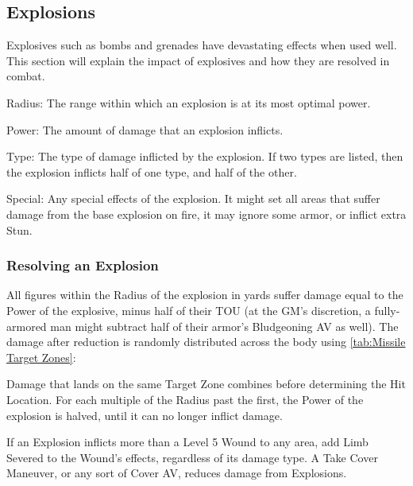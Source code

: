\documentclass[oneside,11pt,english]{book}
\begin{document}
\subsection{Explosions}\label{sec:Explosions}
Explosives such as bombs and grenades have devastating effects when used well. This section will explain the impact of explosives and how they are resolved in combat.
	\begin{description}
		\item Radius: The range within which an explosion is at its most optimal power.
		\item Power: The amount of damage that an explosion inflicts.
		\item Type: The type of damage inflicted by the explosion. If two types are listed, then the explosion inflicts half of one type, and half of the other.
		\item Special: Any special effects of the explosion. It might set all areas that suffer damage from the base explosion on fire, it may ignore some armor, or inflict extra Stun.
	\end{description}

\subsubsection{Resolving an Explosion}
All figures within the Radius of the explosion in yards suffer damage equal to the Power of the explosive, minus half of their TOU (at the GM's discretion, a fully-armored man might subtract half of their armor's Bludgeoning AV as well). The damage after reduction is randomly distributed across the body using \autoref{tab:Missile Target Zones}:~ 

Damage that lands on the same Target Zone combines before determining the Hit Location.
For each multiple of the Radius past the first, the Power of the explosion is halved, until it can no longer inflict damage. 

If an Explosion inflicts more than a Level 5 Wound to any area, add Limb Severed to the Wound's effects, regardless of its damage type.
A Take Cover Maneuver, or any sort of Cover AV, reduces damage from Explosions.
\end{document}
